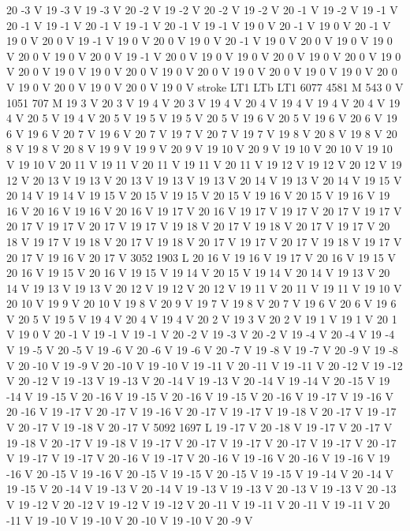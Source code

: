 {{{{{20 -3 V
19 -3 V
19 -3 V
20 -2 V
19 -2 V
20 -2 V
19 -2 V
20 -1 V
19 -2 V
19 -1 V
20 -1 V
19 -1 V
20 -1 V
19 -1 V
20 -1 V
19 -1 V
19 0 V
20 -1 V
19 0 V
20 -1 V
19 0 V
20 0 V
19 -1 V
19 0 V
20 0 V
19 0 V
20 -1 V
19 0 V
20 0 V
19 0 V
19 0 V
20 0 V
19 0 V
20 0 V
19 -1 V
20 0 V
19 0 V
19 0 V
20 0 V
19 0 V
20 0 V
19 0 V
20 0 V
19 0 V
19 0 V
20 0 V
19 0 V
20 0 V
19 0 V
20 0 V
19 0 V
19 0 V
20 0 V
19 0 V
20 0 V
19 0 V
20 0 V
19 0 V
stroke
LT1
LTb
LT1
6077 4581 M
543 0 V
1051 707 M
19 3 V
20 3 V
19 4 V
20 3 V
19 4 V
20 4 V
19 4 V
19 4 V
20 4 V
19 4 V
20 5 V
19 4 V
20 5 V
19 5 V
19 5 V
20 5 V
19 6 V
20 5 V
19 6 V
20 6 V
19 6 V
19 6 V
20 7 V
19 6 V
20 7 V
19 7 V
20 7 V
19 7 V
19 8 V
20 8 V
19 8 V
20 8 V
19 8 V
20 8 V
19 9 V
19 9 V
20 9 V
19 10 V
20 9 V
19 10 V
20 10 V
19 10 V
19 10 V
20 11 V
19 11 V
20 11 V
19 11 V
20 11 V
19 12 V
19 12 V
20 12 V
19 12 V
20 13 V
19 13 V
20 13 V
19 13 V
19 13 V
20 14 V
19 13 V
20 14 V
19 15 V
20 14 V
19 14 V
19 15 V
20 15 V
19 15 V
20 15 V
19 16 V
20 15 V
19 16 V
19 16 V
20 16 V
19 16 V
20 16 V
19 17 V
20 16 V
19 17 V
19 17 V
20 17 V
19 17 V
20 17 V
19 17 V
20 17 V
19 17 V
19 18 V
20 17 V
19 18 V
20 17 V
19 17 V
20 18 V
19 17 V
19 18 V
20 17 V
19 18 V
20 17 V
19 17 V
20 17 V
19 18 V
19 17 V
20 17 V
19 16 V
20 17 V
3052 1903 L
20 16 V
19 16 V
19 17 V
20 16 V
19 15 V
20 16 V
19 15 V
20 16 V
19 15 V
19 14 V
20 15 V
19 14 V
20 14 V
19 13 V
20 14 V
19 13 V
19 13 V
20 12 V
19 12 V
20 12 V
19 11 V
20 11 V
19 11 V
19 10 V
20 10 V
19 9 V
20 10 V
19 8 V
20 9 V
19 7 V
19 8 V
20 7 V
19 6 V
20 6 V
19 6 V
20 5 V
19 5 V
19 4 V
20 4 V
19 4 V
20 2 V
19 3 V
20 2 V
19 1 V
19 1 V
20 1 V
19 0 V
20 -1 V
19 -1 V
19 -1 V
20 -2 V
19 -3 V
20 -2 V
19 -4 V
20 -4 V
19 -4 V
19 -5 V
20 -5 V
19 -6 V
20 -6 V
19 -6 V
20 -7 V
19 -8 V
19 -7 V
20 -9 V
19 -8 V
20 -10 V
19 -9 V
20 -10 V
19 -10 V
19 -11 V
20 -11 V
19 -11 V
20 -12 V
19 -12 V
20 -12 V
19 -13 V
19 -13 V
20 -14 V
19 -13 V
20 -14 V
19 -14 V
20 -15 V
19 -14 V
19 -15 V
20 -16 V
19 -15 V
20 -16 V
19 -15 V
20 -16 V
19 -17 V
19 -16 V
20 -16 V
19 -17 V
20 -17 V
19 -16 V
20 -17 V
19 -17 V
19 -18 V
20 -17 V
19 -17 V
20 -17 V
19 -18 V
20 -17 V
5092 1697 L
19 -17 V
20 -18 V
19 -17 V
20 -17 V
19 -18 V
20 -17 V
19 -18 V
19 -17 V
20 -17 V
19 -17 V
20 -17 V
19 -17 V
20 -17 V
19 -17 V
19 -17 V
20 -16 V
19 -17 V
20 -16 V
19 -16 V
20 -16 V
19 -16 V
19 -16 V
20 -15 V
19 -16 V
20 -15 V
19 -15 V
20 -15 V
19 -15 V
19 -14 V
20 -14 V
19 -15 V
20 -14 V
19 -13 V
20 -14 V
19 -13 V
19 -13 V
20 -13 V
19 -13 V
20 -13 V
19 -12 V
20 -12 V
19 -12 V
19 -12 V
20 -11 V
19 -11 V
20 -11 V
19 -11 V
20 -11 V
19 -10 V
19 -10 V
20 -10 V
19 -10 V
20 -9 V
}}}}}
